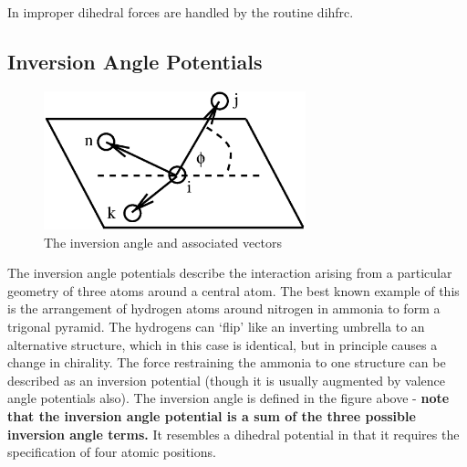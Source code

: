 In \D{} improper dihedral forces are handled by the routine
{\sc dihfrc}.

\subsection{Inversion Angle Potentials}

\begin{figure}[ht]
\begin{center}
\includegraphics[height=4cm]{invers.eps}
\caption{The inversion angle and associated vectors}
\end{center}
\end{figure}

The inversion angle potentials describe the interaction arising from a
particular geometry of three atoms around a central atom. The best
known example of this is the arrangement of hydrogen atoms around
nitrogen in ammonia to form a trigonal pyramid. The hydrogens can
`flip' like an inverting umbrella to an alternative structure, which
in this case is identical, but in principle causes a change in
chirality. The force restraining the ammonia to one structure can be
described as an inversion potential (though it is usually augmented by
valence angle potentials also). The inversion angle is defined in the
figure above - {\bf note that the inversion angle potential is a sum of
the three possible inversion angle terms.} It resembles a dihedral
potential in that it requires the specification of four atomic
positions.

